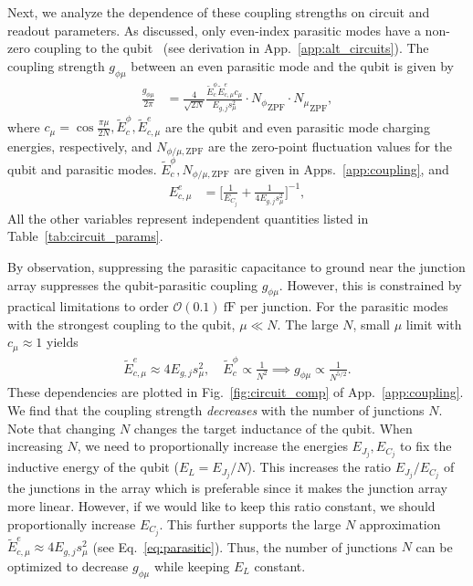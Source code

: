 \documentclass[%
reprint,
superscriptaddress,
 amsmath,amssymb,
 aps,
 prx,
longbibliography,
floatfix,
]{revtex4-2}
\newcommand{\singh}[1]{{\color{orange}{{}#1}}}%
\begin{document}
Next, we analyze the dependence of these coupling strengths on circuit and readout parameters. As discussed, only even-index parasitic modes have a non-zero coupling to the qubit~\cite{viola2015collective} (see derivation in App.~\ref{app:alt_circuits}). The coupling strength $g_{\phi \mu}$ between an even parasitic mode and the qubit is given by
\begin{align}
\frac{g_{\phi\mu}}{2\pi}&=\frac{4}{\sqrt{2N}} \frac{\tilde{E}^\phi_c\tilde{E}^e_{c,\mu}c_\mu}{E_{g,j}s_\mu^2}     \cdot {N_\phi}_{\mathrm{ZPF}} \cdot {N_\mu}_{\mathrm{ZPF}},
\end{align}
where $c_\mu=\cos{\frac{\pi\mu}{2N}},\tilde{E}_c^\phi,\tilde{E}^e_{c,\mu} $ are the qubit and even parasitic mode charging energies, respectively, and $N_{\phi/\mu,\mathrm{ZPF}}$ are the zero-point fluctuation values for the qubit and parasitic modes. $\tilde{E}_c^\phi,N_{\phi/\mu,\mathrm{ZPF}}$ are given in Apps.~\ref{app:coupling}, and
\begin{align}
E_{c,\mu}^e&=\Big[\frac{1}{E_{C_j}}+\frac{1}{4E_{g,j}s_\mu^2}\Big]^{-1},\label{eq:parasitic}
\end{align}
\singh{where $s_\mu = \sin (\frac{\pi \mu}{2N})$.} All the other variables represent independent quantities listed in Table~\ref{tab:circuit_params}. 

By observation, suppressing the parasitic capacitance to ground near the junction array suppresses the qubit-parasitic coupling $g_{\phi\mu}$. However, this is constrained by practical limitations to order $\mathcal{O}(0.1) \ \mathrm{fF}$  per junction. For the parasitic modes with the strongest coupling to the qubit, $\mu\ll N$. The large $N$, small $\mu$ limit with $c_\mu\approx 1$ yields
\begin{align}
    \tilde{E}^e_{c,\mu}\approx 4E_{g,j}s_\mu^2, \quad \tilde{E}^\phi_c\propto \frac{1}{N^2}\implies g_{\phi\mu}\propto \frac{1}{N^{5/2}}.\label{eq:dep1}
\end{align}
These dependencies are plotted in Fig.~\ref{fig:circuit_comp} of App.~\ref{app:coupling}. We find that the coupling strength \textit{decreases} with the number of junctions $N$. Note that changing $N$ changes the target inductance of the qubit. When increasing $N$, we need to proportionally increase the energies $E_{J_j}, E_{C_j}$ to fix the inductive energy of the qubit ($E_L=E_{J_j}/N$). This increases the ratio $E_{J_j}/E_{C_j}$ of the junctions in the array which is preferable since it makes the junction array more linear. However, if we would like to keep this ratio constant, we should proportionally increase $E_{C_j}$. This further supports the large $N$ approximation $\tilde{E}_{c,\mu}^e\approx 4E_{g,j}s_\mu^2$ (see Eq.~\ref{eq:parasitic}). Thus, the number of junctions $N$ can be optimized to decrease $g_{\phi\mu}$ while keeping $E_L$ constant. 
\end{document}
